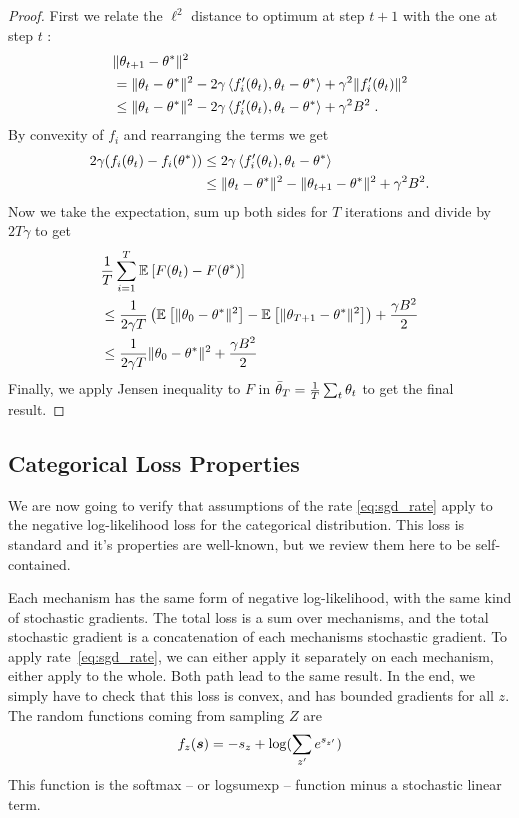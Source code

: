 \begin{subappendices}
\begin{proof}
First we relate the $\ell^2$ distance to optimum at step $t+1$ with the one at step $t$ :
\begin{align*}
    &\| \theta_{t+1} - \theta^{*} \|^2 \\
    &= \| \theta_t - \theta^{*} \|^2 - 2 \gamma \left < f'_i(\theta_t) , \theta_t-\theta^{*} \right> + \gamma^2\|f_i'(\theta_t)\|^2 \\
    &\leq \| \theta_t - \theta^{*} \|^2 - 2 \gamma \left < f'_i(\theta_t) , \theta_t-\theta^{*} \right> + \gamma^2B^2 \; .
\end{align*}
By convexity of $f_i$ and rearranging the terms we get 
\begin{align*}
2\gamma( f_i(\theta_t) - f_i(\theta^{*}) ) & \leq 2 \gamma \left < f'_i(\theta_t) , \theta_t-\theta^{*} \right> \\
& \leq  \| \theta_t - \theta^{*} \|^2 - \| \theta_{t+1} - \theta^{*} \|^2+ \gamma^2B^2.
\end{align*}
Now we take the expectation, sum up both sides for $T$ iterations and divide by $2T\gamma$ to get
\begin{align*}
    &\frac{1}{T} \sum_{i=1}^T \mathbb{E}_{} \left[ F(\theta_t) - F(\theta^{*}) \right]  \\
    & \leq \frac{1}{2\gamma T}\left(\mathbb{E}_{} \left[ \|\theta_0- \theta^{*}\|^2 \right] 
    - \mathbb{E}_{} \left[ \|\theta_{T+1}- \theta^{*}\|^2 \right] \right)
    + \frac{\gamma B^2}{2}\\
    & \leq \frac{1}{2\gamma T}\|\theta_0- \theta^{*}\|^2 + \frac{\gamma B^2}{2}
\end{align*}
Finally, we apply Jensen inequality to $F$ in $\bar{\theta}_T = \frac{1}{T} \sum_t \theta_t$
to get the final result.
\end{proof}

\subsection{Categorical Loss Properties}
\label{apdx:categorical_optimization}

We are now going to verify that assumptions of the rate \eqref{eq:sgd_rate} apply to the negative log-likelihood loss for the categorical distribution.
This loss is standard and it's properties are well-known, but we review them here to be self-contained.

Each mechanism has the same form of negative log-likelihood, with the same kind of stochastic gradients.
The total loss is a sum over mechanisms, and the total stochastic gradient is a concatenation of each mechanisms stochastic gradient.
To apply rate~\ref{eq:sgd_rate}, we can either apply it separately on each mechanism, either apply to the whole. Both path lead to the same result.
In the end, we simply have to check that this loss is convex, and has bounded gradients for all $z$.
The random functions coming from sampling $Z$ are 
\begin{equation}
    f_z({\bm{s}}) = -s_z + \log(\sum_{z'} e^{s_{z'}} )
\end{equation}
This function is the softmax -- or logsumexp -- function minus a  stochastic linear term. 


\end{subappendices}
